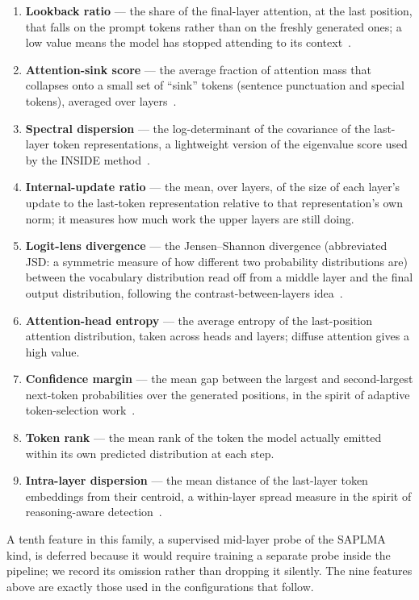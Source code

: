 \begin{enumerate}[leftmargin=2.1em,itemsep=0.25em,label=\textbf{(\arabic*)}]
\item \textbf{Lookback ratio} --- the share of the final-layer attention, at the last
position, that falls on the prompt tokens rather than on the freshly generated ones; a low
value means the model has stopped attending to its context~\cite{chuang2024lookback}.
\item \textbf{Attention-sink score} --- the average fraction of attention mass that
collapses onto a small set of ``sink'' tokens (sentence punctuation and special tokens),
averaged over layers~\cite{xiao2023streamingllm}.
\item \textbf{Spectral dispersion} --- the log-determinant of the covariance of the
last-layer token representations, a lightweight version of the eigenvalue score used by the
INSIDE method~\cite{chen2024inside}.
\item \textbf{Internal-update ratio} --- the mean, over layers, of the size of each layer's
update to the last-token representation relative to that representation's own norm; it
measures how much work the upper layers are still doing.
\item \textbf{Logit-lens divergence} --- the Jensen--Shannon divergence (abbreviated JSD: a
symmetric measure of how different two probability distributions are) between the vocabulary
distribution read off from a middle layer and the final output distribution, following the
contrast-between-layers idea~\cite{chuang2024dola}.
\item \textbf{Attention-head entropy} --- the average entropy of the last-position attention
distribution, taken across heads and layers; diffuse attention gives a high value.
\item \textbf{Confidence margin} --- the mean gap between the largest and second-largest
next-token probabilities over the generated positions, in the spirit of adaptive
token-selection work~\cite{niu2025hami}.
\item \textbf{Token rank} --- the mean rank of the token the model actually emitted within
its own predicted distribution at each step.
\item \textbf{Intra-layer dispersion} --- the mean distance of the last-layer token
embeddings from their centroid, a within-layer spread measure in the spirit of
reasoning-aware detection~\cite{d2hscore2025}.
\end{enumerate}

A tenth feature in this family, a supervised mid-layer probe of the SAPLMA kind, is deferred
because it would require training a separate probe inside the pipeline; we record its
omission rather than dropping it silently. The nine features above are exactly those used in
the configurations that follow.

